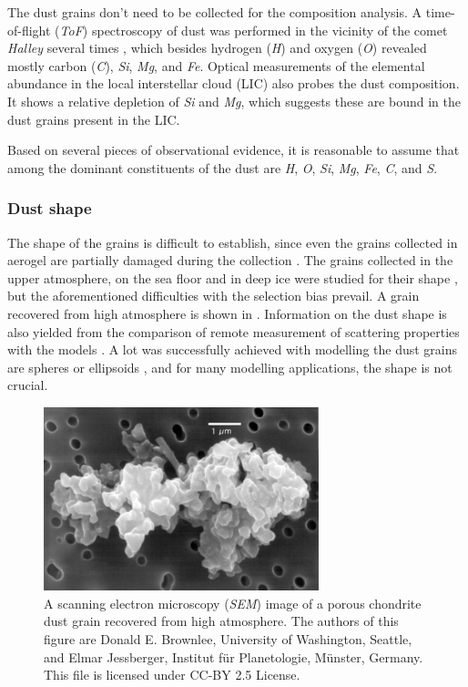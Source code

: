 The dust grains don't need to be collected for the composition analysis. A time-of-flight (\textit{ToF}) spectroscopy of dust was performed in the vicinity of the comet \textit{Halley} several times \citep{jessberger1988aspects}, which besides hydrogen (\textit{H}) and oxygen (\textit{O}) revealed mostly carbon (\textit{C}), \textit{Si}, \textit{Mg}, and \textit{Fe}. Optical measurements of the elemental abundance in the local interstellar cloud (LIC) also probes the dust composition. It shows a relative depletion of \textit{Si} and \textit{Mg}, which suggests these are bound in the dust grains present in the LIC. 

Based on several pieces of observational evidence, it is reasonable to assume that among the dominant constituents of the dust are \textit{H}, \textit{O}, \textit{Si}, \textit{Mg}, \textit{Fe}, \textit{C}, and \textit{S}.

\subsubsection{Dust shape}

The shape of the grains is difficult to establish, since even the grains collected in aerogel are partially damaged during the collection \citep{burchell2006cosmic}. The grains collected in the upper atmosphere, on the sea floor and in deep ice were studied for their shape \citep{jessberger2001properties}, but the aforementioned difficulties with the selection bias prevail. A grain recovered from high atmosphere is shown in . Information on the dust shape is also yielded from the comparison of remote measurement of scattering properties with the models \citep{min2005modeling}. A lot was successfully achieved with modelling the dust grains are spheres or ellipsoids \citep{mann2010interstellar}, and for many modelling applications, the shape is not crucial.

\begin{figure}[h]
 	\centering
 	\includegraphics[width=8cm]{figures/grain.jpg}
 	\caption{A scanning electron microscopy (\textit{SEM}) image of a porous chondrite dust grain recovered from high atmosphere.  The authors of this figure are Donald E. Brownlee, University of Washington, Seattle, and Elmar Jessberger, Institut für Planetologie, Münster, Germany.
This file is licensed under CC-BY 2.5 License.}
 	\label{fig:dust_grain}
\end{figure}

